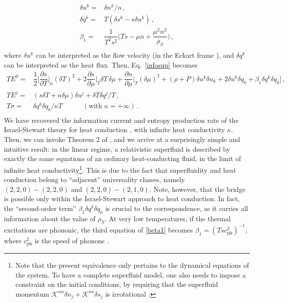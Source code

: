 \documentclass[a4paper, amsfonts, amssymb, amsmath, reprint, showkeys, nofootinbib, twoside, onecolumn,notitlepage]{revtex4-1}
\newcommand{\spc}{\quad \quad \quad}
\begin{document}
\begin{equation}\label{beta1}
\begin{split}
\delta u^k ={}& \delta n^k/n \, ,  \\
\delta q^k ={}& T(\delta s^k-s\delta u^k) \, , \\
\beta_1 ={}&  \dfrac{1}{T^2 s^2}\bigg(Ts-\mu n + \dfrac{\mu^2n^2}{\rho_S}\bigg) \, , \\
\end{split}
\end{equation}
where $\delta u^k$ can be interpreted as the flow velocity (in the Eckart frame \cite{Eckart40}), and $\delta q^k$ can be interpreted as the heat flux.
Then, Eq.\ \eqref{infosup} becomes
\begin{equation}\label{infoheat}
\begin{split}
TE^0 ={}& \dfrac{1}{2} \bigg[\dfrac{\partial s}{\partial T}\bigg|_{\mu}  \! (\delta T)^2 + 2 \dfrac{\partial s}{\partial \mu}\bigg|_{T}  \! \delta T \, \delta \mu + \dfrac{\partial n}{\partial \mu}\bigg|_{T} \!(\delta \mu)^2 + (\rho+P)\delta u^k \delta u_k +2\delta u^k \delta q_k + \beta_1 \delta q^k \delta q_k  \bigg] \, , \\
TE^j ={}& (s  \delta T +n  \delta \mu)\delta u^j + \delta T \delta q^j/T \, , \\
T\sigma ={}& \delta q^k \delta q_k /\kappa T \spc  (\text{with }\kappa=+\infty) \, . \\
\end{split}
\end{equation}
We have recovered the information current and entropy production rate of the Israel-Stewart theory for heat conduction \cite{OlsonRegularCarter1990}, with infinite heat conductivity $\kappa$. Then, we can invoke Theorem 2 of \cite{paperI}, and we arrive at a surprisingly simple and intuitive result: in the linear regime, a relativistic superfluid is described by exactly the same equations of an ordinary heat-conducting fluid, in the limit of infinite heat conductivity\footnote{Note that the present equivalence only pertains to the dynamical equations of the system. To have a complete superfluid model, one also needs to impose a constraint on the initial conditions, by requiring that the superfluid momentum $\mathcal{K}^{nn}\delta n_j +\mathcal{K}^{ns}\delta s_j$ is irrotational \cite{cool1995}.}. This is due to the fact that superfluidity and heat conduction belong to ``adjacent'' universality classes, namely $(2,2,0)-(2,2,0)$ and $(2,2,0)-(2,1,0)$. Note, however, that the bridge is possible only within the Israel-Stewart approach to heat conduction. In fact, the ``second-order term'' $\beta_1 \delta q^k \delta q_k$ is crucial to the correspondence, as it carries all information about the value of $\rho_S$. At very low temperatures, if the thermal excitations are phononic, the third equation of \eqref{beta1} becomes  $\beta_1 = (Tsc_{\text{ph}}^2)^{-1}$, where $c_{\text{ph}}^2$ is the speed of phonons \cite{landau6}.
\end{document}
